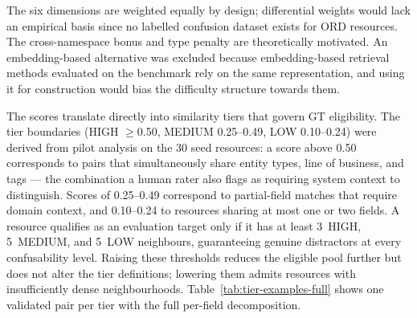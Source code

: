 The six dimensions are weighted equally by design; differential weights would lack an empirical basis since no labelled confusion dataset exists for ORD resources. The cross-namespace bonus and type penalty are theoretically motivated. An embedding-based alternative was excluded because embedding-based retrieval methods evaluated on the benchmark rely on the same representation, and using it for construction would bias the difficulty structure towards them.

The scores translate directly into similarity tiers that govern GT eligibility. The tier boundaries (HIGH $\geq$0.50, MEDIUM 0.25--0.49, LOW 0.10--0.24) were derived from pilot analysis on the 30 seed resources: a score above 0.50 corresponds to pairs that simultaneously share entity types, line of business, and tags --- the combination a human rater also flags as requiring system context to distinguish. Scores of 0.25--0.49 correspond to partial-field matches that require domain context, and 0.10--0.24 to resources sharing at most one or two fields. A resource qualifies as an evaluation target only if it has at least 3~HIGH, 5~MEDIUM, and 5~LOW neighbours, guaranteeing genuine distractors at every confusability level. Raising these thresholds reduces the eligible pool further but does not alter the tier definitions; lowering them admits resources with insufficiently dense neighbourhoods. Table~\ref{tab:tier-examples-full} shows one validated pair per tier with the full per-field decomposition.

